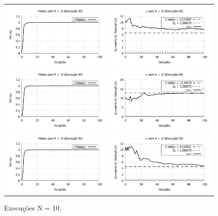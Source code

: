 \begin{figure}[phtb]
\begin{tabular}{@{}cc@{}}
		\includegraphics[width=.40\textwidth]{figs/resultados/N10_03_fitness.pdf} &
    \includegraphics[width=.40\textwidth]{figs/resultados/N10_03_rho.pdf}   \\
		\includegraphics[width=.40\textwidth]{figs/resultados/N10_04_fitness.pdf} &
    \includegraphics[width=.40\textwidth]{figs/resultados/N10_04_rho.pdf}   \\
		\includegraphics[width=.40\textwidth]{figs/resultados/N10_05_fitness.pdf} &
    \includegraphics[width=.40\textwidth]{figs/resultados/N10_05_rho.pdf}
  \end{tabular}
  \caption{Execuções N = 10.}
	\label{fig:execucoes_N10}
\end{figure}
\newpage
	
